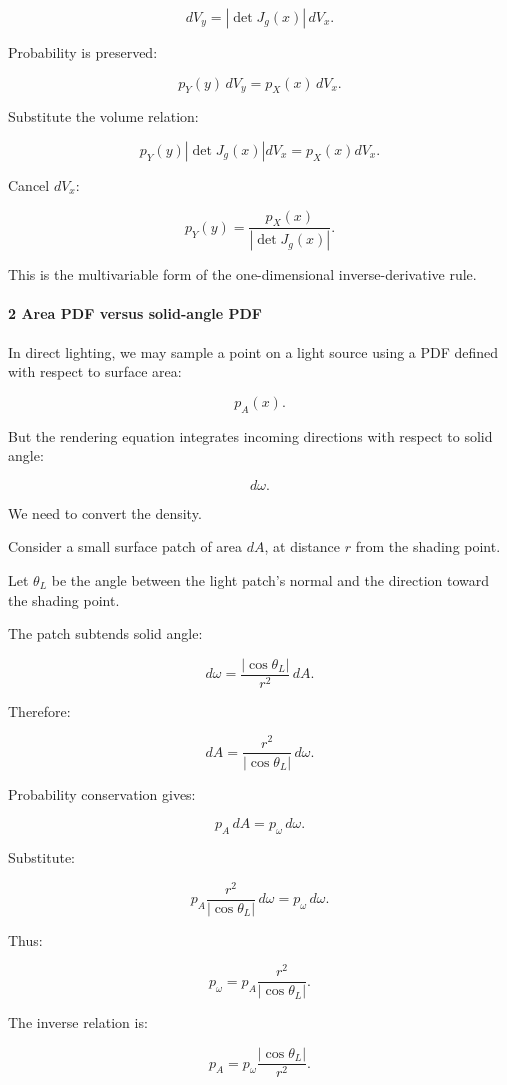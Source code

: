 \[
 dV_y= |\det J_g(x)|\,dV_x.
\]

Probability is preserved:

\[
 p_Y(y)\,dV_y=p_X(x)\,dV_x.
\]

Substitute the volume relation:

\[
 p_Y(y) |\det J_g(x)|dV_x = p_X(x)dV_x.
\]

Cancel \(dV_x\):

\[
 p_Y(y)= \frac{p_X(x)}{|\det J_g(x)|}.
\]

This is the multivariable form of the one-dimensional inverse-derivative rule.

\paragraph{2 Area PDF versus solid-angle PDF}\label{area-pdf-versus-solid-angle-pdf}

In direct lighting, we may sample a point on a light source using a PDF defined with respect to surface area:

\[
 p_A(x).
\]

But the rendering equation integrates incoming directions with respect to solid angle:

\[
 d\omega.
\]

We need to convert the density.

Consider a small surface patch of area \(dA\), at distance \(r\) from the shading point.

Let \(\theta_L\) be the angle between the light patch's normal and the direction toward the shading point.

The patch subtends solid angle:

\[
 \boxed{ d\omega= \frac{|\cos\theta_L|}{r^2}\,dA }.
\]

Therefore:

\[
 dA= \frac{r^2}{|\cos\theta_L|}\,d\omega.
\]

Probability conservation gives:

\[
 p_A\,dA=p_\omega\,d\omega.
\]

Substitute:

\[
 p_A\frac{r^2}{|\cos\theta_L|}\,d\omega = p_\omega\,d\omega.
\]

Thus:

\[
 \boxed{ p_\omega= p_A\frac{r^2}{|\cos\theta_L|} }.
\]

The inverse relation is:

\[
 \boxed{ p_A= p_\omega\frac{|\cos\theta_L|}{r^2} }.
\]

